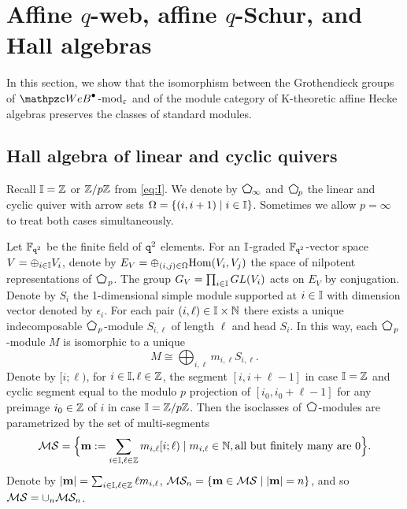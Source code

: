 \section{Affine $q$-web, affine $q$-Schur, and Hall algebras}
\label{sec:affineSchur_Hall}

In this section, we show that the isomorphism between the Grothendieck groups of $\qAW \modf_\eps$ and of the module category of K-theoretic affine Hecke algebras preserves the classes of standard modules. 


\subsection{Hall algebra of linear and cyclic quivers}

Recall $\mathbb{I}=\mathbb{Z}$ or $\mathbb{Z}/p\mathbb{Z}$ from \eqref{eq:I}. We denote by $\peni$ and $\penp$ the linear and cyclic quiver with arrow sets $\Omega =\{(i,i+1)\mid i\in \mathbb{I}\}$.
Sometimes we allow $p=\infty$ to treat both cases simultaneously. 

Let $\mathbb{F}_{\texttt{q}^2}$ be the finite field of $\texttt{q}^2$ elements. For an $\mathbb{I}$-graded $\mathbb{F}_{\texttt{q}^2}$-vector space $V=\oplus_{i\in\mathbb{I}} V_i$, denote by $E_V=\oplus_{(i,j)\in\Omega} {\rm Hom}(V_i, V_j)$ the space of nilpotent representations of $\pen_p$. The group $G_V =\prod_{i\in \mathbb{I}} GL(V_i)$ acts on $E_V$ by conjugation. Denote by $S_i$ the 1-dimensional simple module supported at $i\in\mathbb{I}$ with dimension vector denoted by $\epsilon_i$. For each pair $(i,\ell)\in \mathbb{I}\times \mathbb{N}$ there exists a unique indecomposable $\pen_p$-module $S_{i,\ell}$ of length $\ell$ and head $S_i$. In this way, each $\pen_p$-module $M$ is isomorphic to a unique
\[
M \cong \bigoplus_{i,\ell} m_{i,\ell} S_{i,\ell}.
\]
Denote by $[i;\ell)$, for $i\in\mathbb{I}, \ell \in\mathbb{Z}$, the segment $[i,i+\ell-1]$ in case $\mathbb{I}=\mathbb{Z}$ and cyclic segment equal to the modulo $p$ projection of $[i_0,i_0+\ell-1]$ for any preimage $i_0\in \mathbb{Z}$ of $i$ in case $\mathbb{I}=\mathbb{Z}/p\mathbb{Z}$. Then the isoclasses of $\pen$-modules are parametrized by the set of multi-segments
\begin{align}
    \label{cMcS}
    \mathcal{M}\mathcal{S} =\Big\{\mathbf{m} :=\sum_{i\in\mathbb{I},\ell\in\mathbb{Z}} m_{i,\ell} [i;\ell) \mid m_{i,\ell} \in \mathbb{N}, \text{all but finitely many are }0 \Big\}.
\end{align}
Denote by $|\mathbf{m}|=\sum_{i\in\mathbb{I},\ell\in\mathbb{Z}} \ell m_{i,\ell}$, $\mathcal{M}\mathcal{S}_n=\{\mathbf{m}\in \mathcal{M}\mathcal{S}\mid |\mathbf{m}|=n\}$, and so $\mathcal{M}\mathcal{S}=\cup_n\mathcal{M}\mathcal{S}_n$.

